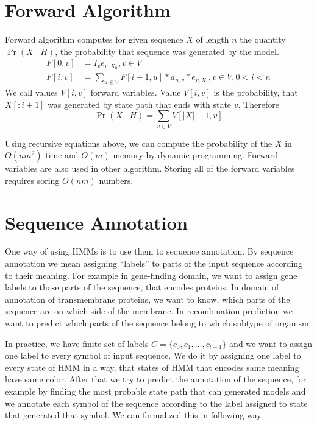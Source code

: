 \section{Forward Algorithm}
Forward algorithm computes for given sequence $X$ of length $n$ the quantity $\Pr\left(X\mid
H\right)$, the probability that sequence
was generated by the model. 
\begin{align}
F[0,v] &= I_ve_{v,X_0}, v\in V\\
F[i,v] &= \sum_{u\in V}F[i-1,u]*a_{u,v}*e_{v,X_i}, v\in V,0< i < n
\end{align}
We call values $V[i,v]$ forward variables. Value $V[i,v]$ is the
probability, that $X[:i+1]$ was generated by state path that ends with state
$v$. Therefore \[\Pr\left(X\mid H\right) = \sum_{v\in V} V[|X|-1,v]\]

Using recursive equations above, we can compute the probability of the $X$ in
$O(nm^2)$ time and $O(m)$ memory by dynamic programming. Forward variables are
also used in other algorithm. Storing all of the forward variables requires
soring $O(nm)$ numbers.

\section{Sequence Annotation}


One way of using HMMs is to use them to sequence annotation. By sequence
annotation we mean assigning ``labels'' to parts of the input sequence according
to their meaning. For example in gene-finding domain, we want to assign gene
labels to those parts of the sequence, that encodes proteins. In domain of
annotation of transmembrane proteins, we want to know, which parts of the
sequence are on which  side of the membrane. In recombination prediction we want
to predict which parts of the sequence belong to which subtype of organism.

In practice, we have finite set of labels $C=\{c_0,c_1,\dots,c_{l-1}\}$ and we
want to assign one label to every symbol of input sequence. We do it by
assigning one label to every state of HMM in a way, that states of HMM that
encodes same meaning have same color. After that we try to predict the
annotation of the sequence, for example by finding the most probable state path
that can generated models and we annotate each symbol of the sequence according
to the label assigned to state that generated that symbol. We can formalized
this in following way.


